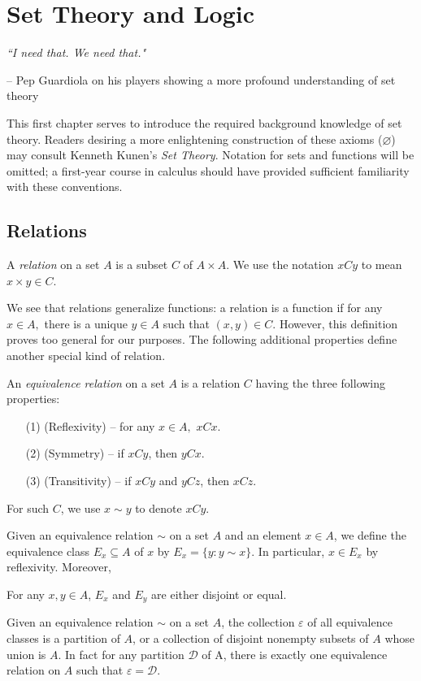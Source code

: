 \section{Set Theory and Logic}
\begin{center}
    {\it ``I need that. We need that."}
    
    -- Pep Guardiola on his players showing a more profound understanding of set theory
\end{center}
\vspace{10pt}

This first chapter serves to introduce the required background knowledge of set theory. Readers desiring a more enlightening construction of these axioms ($\varnothing$) may consult Kenneth Kunen's {\it Set Theory}. Notation for sets and functions will be omitted; a first-year course in calculus should have provided sufficient familiarity with these conventions.

\subsection{Relations}
\begin{definition}\label{1.1}
    A {\it relation} on a set $A$ is a subset $C$ of $A \times A$. We use the notation $xCy$ to mean $x \times y \in C$.
\end{definition}

We see that relations generalize functions: a relation is a function if for any $x \in A,$ there is a unique $y \in A$ such that $(x, y) \in C$. However, this definition proves too general for our purposes. The following additional properties define another special kind of relation.
\begin{definition}\label{1.2}
    An {\it equivalence relation} on a set $A$ is a relation $C$ having the three following properties:
    \begin{enumerate}
        \item[(1)] (Reflexivity) -- for any $x \in A,$ $xCx$.
        \item[(2)] (Symmetry) -- if $xCy$, then $yCx$.
        \item[(3)] (Transitivity) -- if $xCy$ and $yCz$, then $xCz$.
    \end{enumerate}
    For such $C$, we use $x \sim y$ to denote $xCy$.
\end{definition}
Given an equivalence relation $\sim$ on a set $A$ and an element $x \in A$, we define the equivalence class $E_x \subseteq A$ of $x$ by $E_x = \{y : y \sim x\}.$ In particular, $x \in E_x$ by reflexivity. Moreover,
\begin{theorem}\label{1.3}
    For any $x, y \in A$, $E_x$ and $E_y$ are either disjoint or equal.
\end{theorem}
Given an equivalence relation $\sim$ on a set $A$, the collection $\varepsilon$ of all equivalence classes is a partition of $A$, or a collection of disjoint nonempty subsets of $A$ whose union is $A$. In fact for any partition $\mathcal{D}$ of A, there is exactly one equivalence relation on $A$ such that $\varepsilon = \mathcal{D}$.

